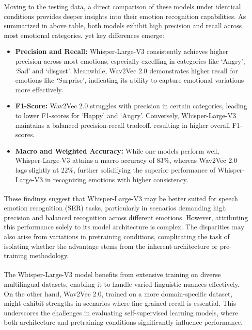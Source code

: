 \documentclass[a4paper,12pt]{article}
\begin{document}
Moving to the testing data, a direct comparison of these models under identical conditions provides deeper insights into their emotion recognition capabilities. As summarized in above table, both models exhibit high precision and recall across most emotional categories, yet key differences emerge:
\begin{itemize}


\item \textbf{Precision and Recall:} Whisper-Large-V3 consistently achieves higher precision across most emotions, especially excelling in categories like ‘Angry’, ‘Sad’ and ‘disgust’. Meanwhile, Wav2Vec 2.0 demonstrates higher recall for emotions like ‘Surprise’, indicating its ability to capture emotional variations more effectively.
\item \textbf{F1-Score:} Wav2Vec 2.0 struggles with precision in certain categories, leading to lower F1-scores for ‘Happy’ and ‘Angry’. Conversely, Whisper-Large-V3 maintains a balanced precision-recall tradeoff, resulting in higher overall F1-scores.
\item \textbf{Macro and Weighted Accuracy:} While one models perform well, Whisper-Large-V3 attains a macro accuracy of 83\%, whereas Wav2Vec 2.0 lags slightly at 22\%, further solidifying the superior performance of Whisper-Large-V3 in recognizing emotions with higher consistency.
\end{itemize}
\paragraph{}
These findings suggest that Whisper-Large-V3 may be better suited for speech emotion recognition (SER) tasks, particularly in scenarios demanding high precision and balanced recognition across different emotions. However, attributing this performance solely to its model architecture is complex. The disparities may also arise from variations in pretraining conditions, complicating the task of isolating whether the advantage stems from the inherent architecture or pre-training methodology.
\paragraph{}
The Whisper-Large-V3 model benefits from extensive training on diverse multilingual datasets, enabling it to handle varied linguistic nuances effectively. On the other hand, Wav2Vec 2.0, trained on a more domain-specific dataset, might exhibit strengths in scenarios where fine-grained recall is essential. This underscores the challenges in evaluating self-supervised learning models, where both architecture and pretraining conditions significantly influence performance.
\end{document}
